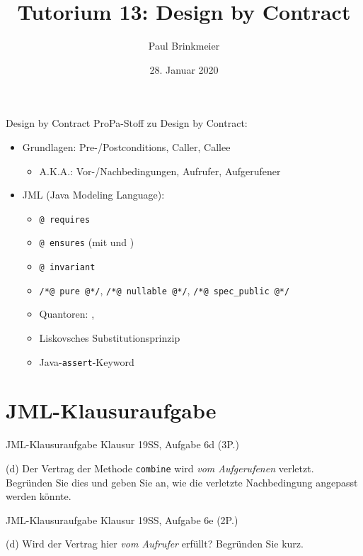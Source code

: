\documentclass{beamer}
\title{Tutorium 13: Design by Contract}
\author{Paul Brinkmeier}
\institute{Tutorium Programmierparadigmen am KIT}
\date{28. Januar 2020}
\newcommand{\code}[1]{
	\begin{mdframed}
		
	\end{mdframed}
}
\begin{document}
\begin{frame}
	\titlepage
\end{frame}

\begin{frame}{Design by Contract}
	ProPa-Stoff zu Design by Contract:

	\begin{itemize}
		\item Grundlagen: Pre-/Postconditions, Caller, Callee
		\begin{itemize}
			\item A.K.A.: Vor-/Nachbedingungen, Aufrufer, Aufgerufener
		\end{itemize}
		\item JML (Java Modeling Language):
		\begin{itemize}
			\item \texttt{@ requires}
			\item \texttt{@ ensures} (mit \texttt{\string\old} und \texttt{\string\result})
			\item \texttt{@ invariant}
			\item \texttt{/*@ pure @*/}, \texttt{/*@ nullable @*/}, \texttt{/*@ spec_public @*/}
			\item Quantoren: \texttt{\string\forall}, \texttt{\string\exists}
			\item Liskovsches Substitutionsprinzip
			\pause
			\item Java-\texttt{assert}-Keyword
		\end{itemize}
	\end{itemize}
\end{frame}

\section{JML-Klausuraufgabe}

\begin{frame}{JML-Klausuraufgabe}
    Klausur 19SS, Aufgabe 6d (3P.)

    {
    \footnotesize
    \code{code/19ss-a6d.java}

    (d) Der Vertrag der Methode \texttt{combine} wird \emph{vom Aufgerufenen} verletzt.
    Begründen Sie dies und geben Sie an, wie die verletzte Nachbedingung angepasst werden könnte.
    }
\end{frame}

\begin{frame}{JML-Klausuraufgabe}
    Klausur 19SS, Aufgabe 6e (2P.)

    {
    \footnotesize
    \code{code/19ss-a6e.java}

    (d) Wird der Vertrag hier \emph{vom Aufrufer} erfüllt?
    Begründen Sie kurz.
    }
\end{frame}
\end{document}
